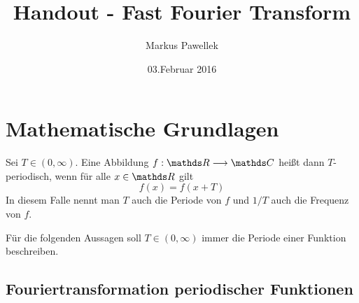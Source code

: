 

\cfoot[]{\newline\newline\newline\pagemark}

\title{Handout - Fast Fourier Transform}
\author{Markus Pawellek}
\date{03.Februar 2016}


	
	\maketitle
	\thispagestyle{empty}

	\section{Mathematische Grundlagen} %
	\label{sec:mathematische_grundlagen}

		

		\begin{definition*}
			Sei $T\in(0,\infty)$.
			Eine Abbildung $f:\SR\longrightarrow\SC$ heißt dann $T$-periodisch, wenn für alle $x\in\SR$ gilt
			$$ f(x) = f(x+T) $$
			In diesem Falle nennt man $T$ auch die Periode von $f$ und $1/T$ auch die Frequenz von $f$.
		\end{definition*}
		Für die folgenden Aussagen soll $T\in(0,\infty)$ immer die Periode einer Funktion beschreiben.

		\subsection{Fouriertransformation periodischer Funktionen} %
		\label{sub:fouriertransformation_periodischer_funktionen}
		
